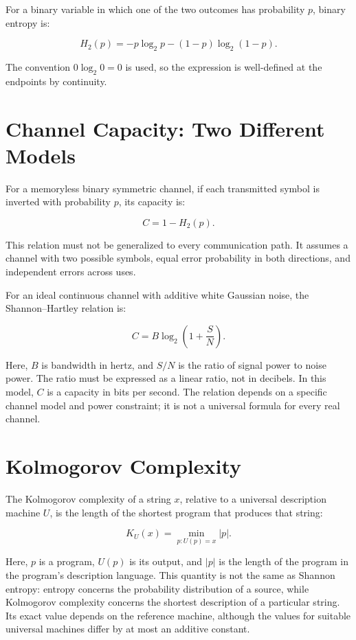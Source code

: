 For a binary variable in which one of the two outcomes has probability \(p\), binary entropy is:

\[
H_2(p)=-p\log_2 p-(1-p)\log_2(1-p).
\]

The convention \(0\log_2 0=0\) is used, so the expression is well-defined at the endpoints by continuity.

\section{Channel Capacity: Two Different Models}

For a memoryless binary symmetric channel, if each transmitted symbol is inverted with probability \(p\), its capacity is:

\[
C=1-H_2(p).
\]

This relation must not be generalized to every communication path. It assumes a channel with two possible symbols, equal error probability in both directions, and independent errors across uses.

For an ideal continuous channel with additive white Gaussian noise, the Shannon–Hartley relation is:

\[
C=B\log_2\left(1+\frac{S}{N}\right).
\]

Here, \(B\) is bandwidth in hertz, and \(S/N\) is the ratio of signal power to noise power. The ratio must be expressed as a linear ratio, not in decibels. In this model, \(C\) is a capacity in bits per second. The relation depends on a specific channel model and power constraint; it is not a universal formula for every real channel.

\section{Kolmogorov Complexity}

The Kolmogorov complexity of a string \(x\), relative to a universal description machine \(U\), is the length of the shortest program that produces that string:

\[
K_U(x)=\min_{p:U(p)=x}|p|.
\]

Here, \(p\) is a program, \(U(p)\) is its output, and \(|p|\) is the length of the program in the program's description language. This quantity is not the same as Shannon entropy: entropy concerns the probability distribution of a source, while Kolmogorov complexity concerns the shortest description of a particular string. Its exact value depends on the reference machine, although the values for suitable universal machines differ by at most an additive constant.

